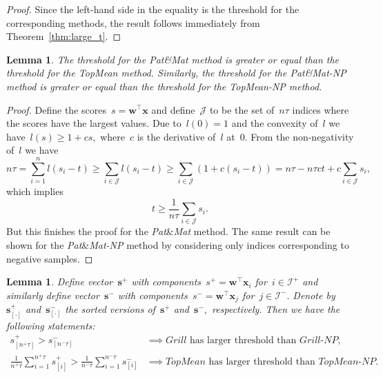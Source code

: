 \documentclass[11pt,a4paper]{article}
\newtheorem{lemma}[thm]{Lemma}
\theoremstyle{definition}
\newcommand{\I}{\mathcal{I}}
\newcommand{\J}{\mathcal{J}}
\newcommand{\grill}{\textit{Grill}\xspace}
\newcommand{\patmat}{\textit{Pat}\textup{\&}\textit{Mat}\xspace}
\newcommand{\topmean}{\textit{TopMean}\xspace}
\newcommand{\grillnp}{\textit{Grill-NP}\xspace}
\newcommand{\patmatnp}{\textit{Pat}\textup{\&}\textit{Mat-NP}\xspace}
\newcommand{\topmeannp}{\textit{TopMean-NP}\xspace}
\begin{document}
\begin{proof}
  Since the left-hand side in the equality is the threshold for the corresponding methods, the result follows immediately from Theorem~\ref{thm:large_t}.
\end{proof}

\begin{lemma}\label{lemma:thresholds1}
  The threshold for the \patmat method is greater or equal than the threshold for the \topmean method. Similarly, the threshold for the \patmatnp method is greater or equal than the threshold for the \topmeannp method. 
\end{lemma}

\begin{proof}
  Define the scores~$s = \bm{w}^\top \bm{x}$ and define~$\J$ to be the set of~$n\tau$ indices where the scores have the largest values. Due to~$l(0) = 1$ and the convexity of~$l$ we have~$l(s) \ge 1 + cs,$ where~$c$ is the derivative of~$l$ at~$0.$ From the non-negativity of~$l$ we have
  \begin{equation*}
    n\tau =   \sum_{i=1}^{n} l(s_i - t)
          \ge \sum_{i \in \J} l(s_i - t)
          \ge \sum_{i \in \J} (1 + c(s_i - t))
          =   n\tau - n\tau ct + c \sum_{i \in \J} s_i,
  \end{equation*}
  which implies
  \begin{equation*}
    t \ge \frac{1}{n\tau}\sum_{i \in \J} s_i.
  \end{equation*}
  But this finishes the proof for the \patmat method. The same result can be shown for the \patmatnp method by considering only indices corresponding to negative samples.
\end{proof}

\begin{lemma}\label{lemma:thresholds2}
  Define vector~$\bm{s}^+$ with components~$s^+ = \bm{w}^\top \bm{x}_i$ for~$i \in \I^+$ and similarly define vector~$\bm{s}^-$ with components~$s^- = \bm{w}^\top \bm{x}_j$ for~$j \in \I^-.$ Denote by~$\bm{s}_{[\cdot]}^+$ and~$\bm{s}_{[\cdot]}^-$ the sorted versions of~$\bm{s}^+$ and~$\bm{s}^-,$ respectively. Then we have the following statements:
  \begin{align*}
    s_{[n^+ \tau]}^+ > s_{[n^- \tau]}^-
    &\implies \grill \text{ has larger threshold than } \grillnp,\\
    \frac{1}{n^+\tau} \sum_{i=1}^{n^+ \tau} s_{[i]}^+ > \frac{1}{n^-\tau} \sum_{i=1}^{n^-\tau} s_{[i]}^-
    & \implies \topmean \text{ has larger threshold than }\topmeannp.\\
  \end{align*}
\end{lemma}
\end{document}
